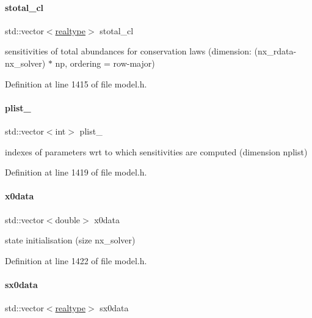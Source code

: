 \paragraph{\texorpdfstring{stotal\_cl}{stotal\_cl}}
{\footnotesize\ttfamily std\+::vector$<$\mbox{\hyperlink{namespaceamici_a1bdce28051d6a53868f7ccbf5f2c14a3}{realtype}}$>$ stotal\+\_\+cl\hspace{0.3cm}{\ttfamily [protected]}}

sensitivities of total abundances for conservation laws (dimension\+: (nx\+\_\+rdata-\/nx\+\_\+solver) $\ast$ np, ordering = row-\/major) 

Definition at line 1415 of file model.\+h.

\mbox{\label{classamici_1_1_model_a67919df701b4afd60d13fc890432d9ec}} 
\paragraph{\texorpdfstring{plist\_}{plist\_}}
{\footnotesize\ttfamily std\+::vector$<$int$>$ plist\+\_\+\hspace{0.3cm}{\ttfamily [protected]}}

indexes of parameters wrt to which sensitivities are computed (dimension nplist) 

Definition at line 1419 of file model.\+h.

\mbox{\label{classamici_1_1_model_ac305126c59aab952182f851679df24f9}} 
\paragraph{\texorpdfstring{x0data}{x0data}}
{\footnotesize\ttfamily std\+::vector$<$double$>$ x0data\hspace{0.3cm}{\ttfamily [protected]}}

state initialisation (size nx\+\_\+solver) 

Definition at line 1422 of file model.\+h.

\mbox{\label{classamici_1_1_model_a7ebdaf00a4177be525b45a39edf1865c}} 
\paragraph{\texorpdfstring{sx0data}{sx0data}}
{\footnotesize\ttfamily std\+::vector$<$\mbox{\hyperlink{namespaceamici_a1bdce28051d6a53868f7ccbf5f2c14a3}{realtype}}$>$ sx0data\hspace{0.3cm}{\ttfamily [protected]}}

